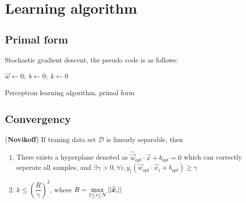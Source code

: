 \section{Learning algorithm}
\subsection{Primal form}
Stochastic gradient descent, the pseudo code is as follows:
\begin{algorithm}[htbp]
    \SetAlgoNoLine
  
    $\vec{w} \leftarrow 0;\; b \leftarrow 0;\; k \leftarrow 0$\;
\caption{Perceptron learning algorithm, primal form}
\end{algorithm}

\subsection{Convergency}
\begin{theorem}
(\textbf{Novikoff}) If traning data set $\mathcal{D}$ is linearly separable, then
\begin{enumerate}
\item There exists a hyperplane denoted as $\widehat{\vec{w}}_{opt} \cdot \vec{x}+b_{opt}=0$ which can correctly seperate all samples, and $\exists\gamma>0,\forall i, y_i(\vec{w}_{opt} \cdot \vec{x}_i+b_{opt}) \geq \gamma$
\item $k \leq \left(\dfrac{R}{\gamma}\right)^2$, where $R=\max\limits_{1 \leq i \leq N} \abs{\abs{\widehat{\vec{x}}_i}}$
\end{enumerate}
\end{theorem}

